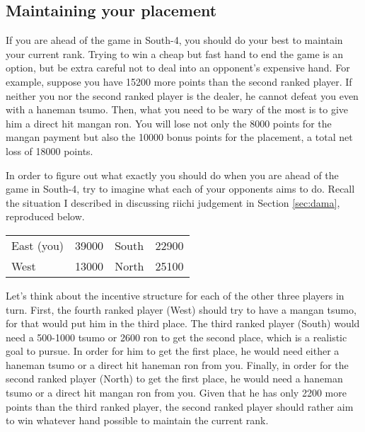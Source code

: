 \subsection*{Maintaining your placement}
If you are ahead of the game in South-4, you should do your best to maintain your current rank. Trying to win a cheap but fast hand to end the game is an option, but be extra careful not to deal into an opponent's expensive hand. For example, suppose you have 15200 more points than the second ranked player. If neither you nor the second ranked player is the dealer, he cannot defeat you even with a {\jap haneman tsumo}. Then, what you need to be wary of the most is to give him a direct hit {\jap mangan ron}. You will lose not only the 8000 points for the {\jap mangan} payment but also the 10000 bonus points for the placement, a total net loss of 18000 points.

\bigskip
In order to figure out what exactly you should do when you are ahead of the game in South-4, try to imagine what each of your opponents aims to do. Recall the situation I described in discussing riichi judgement in Section \ref{sec:dama}, reproduced below.

\begin{table}[h]
\begin{center}
\begin{tabular}{l r l r}
East (you) & 39000 & South & 22900\\
West & 13000 & North & 25100\\
\end{tabular}
\end{center}
\vspace{-10pt}
\end{table}

\bigskip
Let's think about the incentive structure for each of the other three players in turn. First, the fourth ranked player (West) should try to have a {\jap mangan tsumo}, for that would put him in the third place. The third ranked player (South) would need a 500-1000 {\jap tsumo} or 2600 {\jap ron} to get the second place, which is a realistic goal to pursue. In order for him to get the first place, he would need either a {\jap haneman tsumo} or a direct hit {\jap haneman ron} from you. Finally, in order for the second ranked player (North) to get the first place, he would need a {\jap haneman tsumo} or a direct hit {\jap mangan ron} from you. Given that he has only 2200 more points than the third ranked player, the second ranked player should rather aim to win whatever hand possible to maintain the current rank.

